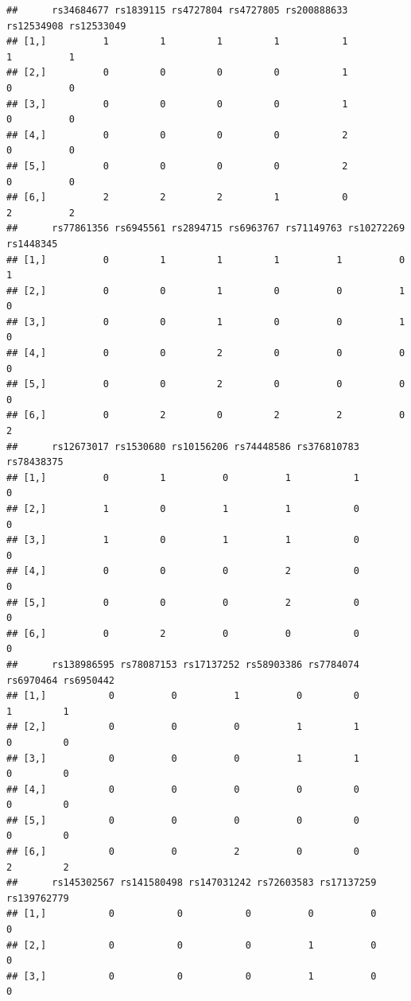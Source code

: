 \documentclass[
]{article}
\begin{document}
\begin{verbatim}
##      rs34684677 rs1839115 rs4727804 rs4727805 rs200888633 rs12534908 rs12533049
## [1,]          1         1         1         1           1          1          1
## [2,]          0         0         0         0           1          0          0
## [3,]          0         0         0         0           1          0          0
## [4,]          0         0         0         0           2          0          0
## [5,]          0         0         0         0           2          0          0
## [6,]          2         2         2         1           0          2          2
##      rs77861356 rs6945561 rs2894715 rs6963767 rs71149763 rs10272269 rs1448345
## [1,]          0         1         1         1          1          0         1
## [2,]          0         0         1         0          0          1         0
## [3,]          0         0         1         0          0          1         0
## [4,]          0         0         2         0          0          0         0
## [5,]          0         0         2         0          0          0         0
## [6,]          0         2         0         2          2          0         2
##      rs12673017 rs1530680 rs10156206 rs74448586 rs376810783 rs78438375
## [1,]          0         1          0          1           1          0
## [2,]          1         0          1          1           0          0
## [3,]          1         0          1          1           0          0
## [4,]          0         0          0          2           0          0
## [5,]          0         0          0          2           0          0
## [6,]          0         2          0          0           0          0
##      rs138986595 rs78087153 rs17137252 rs58903386 rs7784074 rs6970464 rs6950442
## [1,]           0          0          1          0         0         1         1
## [2,]           0          0          0          1         1         0         0
## [3,]           0          0          0          1         1         0         0
## [4,]           0          0          0          0         0         0         0
## [5,]           0          0          0          0         0         0         0
## [6,]           0          0          2          0         0         2         2
##      rs145302567 rs141580498 rs147031242 rs72603583 rs17137259 rs139762779
## [1,]           0           0           0          0          0           0
## [2,]           0           0           0          1          0           0
## [3,]           0           0           0          1          0           0

\end{verbatim}
\end{document}
